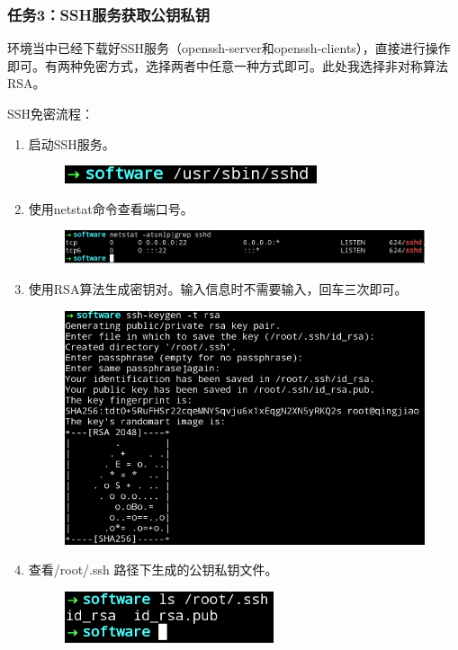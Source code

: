 \documentclass {article}
\begin{document}
			\subsubsection{任务3：SSH服务获取公钥私钥}
				环境当中已经下载好SSH服务（openssh-server和openssh-clients），直接进行操作即可。有两种免密方式，选择两者中任意一种方式即可。此处我选择非对称算法RSA。
							
				SSH免密流程：
				\begin{enumerate}
					\item 启动SSH服务。
						\begin{figure}[H]
							\centering
							\includegraphics{figures/fig9.jpg}
						\end{figure}
					
					\item 使用netstat命令查看端口号。
						\begin{figure}[H]
							\centering
							\includegraphics[width=4.5in]{figures/fig10.jpg}
						\end{figure}
					
					\item 使用RSA算法生成密钥对。输入信息时不需要输入，回车三次即可。
						\begin{figure}[H]
							\centering
							\includegraphics[width=4.5in]{figures/fig11.jpg}
						\end{figure}
					
					\item 查看/root/.ssh 路径下生成的公钥私钥文件。
						\begin{figure}[H]
							\centering
							\includegraphics{figures/fig12.png}
						\end{figure}
				\end{enumerate}
		
\end{document}
